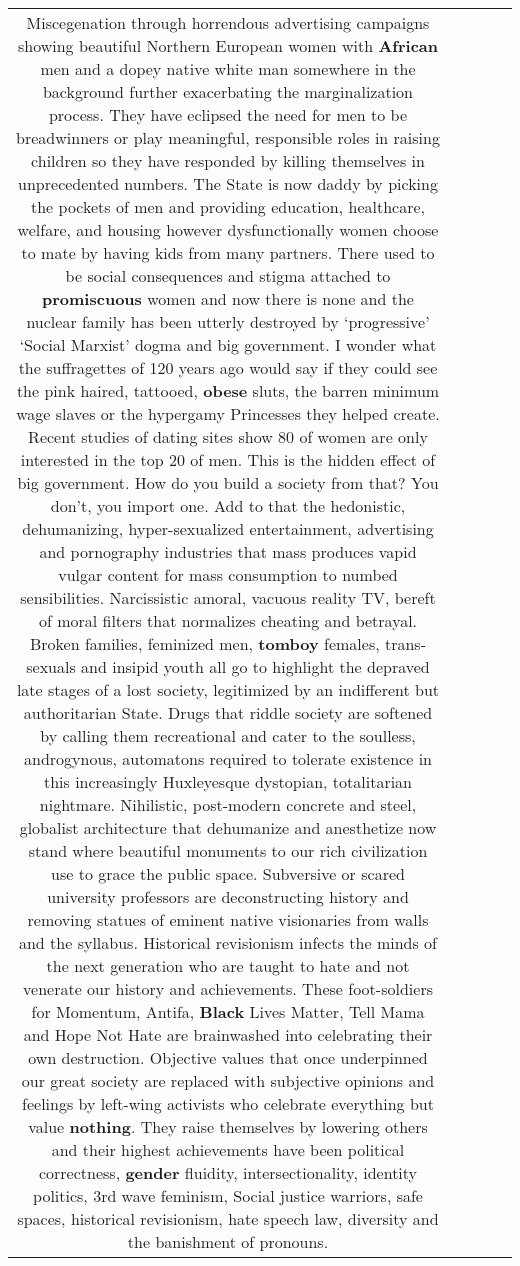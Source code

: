\documentclass[11pt]{article}
\newlength\mylength
\begin{document}
\begin{center}
\begin{longtable}{|C{.65\mylength}|C{.30\mylength}|C{.12\mylength}|C{.12\mylength}|C{.12\mylength}|}
Miscegenation through horrendous advertising campaigns showing beautiful Northern European women with \textbf{African} men and a dopey native white man somewhere in the background further exacerbating the marginalization process. They have eclipsed the need for men to be breadwinners or play meaningful, responsible roles in raising children so they have responded by killing themselves in unprecedented numbers.
 The State is now daddy by picking the pockets of men and providing education, healthcare, welfare, and housing however dysfunctionally women choose to mate by having kids from many partners. There used to be social consequences and stigma attached to \textbf{promiscuous} women and now there is none and the nuclear family has been utterly destroyed by ‘progressive' ‘Social Marxist' dogma and big government. I wonder what the suffragettes of 120 years ago would say if they could see the pink haired, tattooed, \textbf{obese} sluts, the barren minimum wage slaves or the hypergamy Princesses they helped create. Recent studies of dating sites show 80 of women are only interested in the top 20 of men. This is the hidden effect of big government. How do you build a society from that? You don't, you import one. 
Add to that the hedonistic, dehumanizing, hyper-sexualized entertainment, advertising and pornography industries that mass produces vapid vulgar content for mass consumption to numbed sensibilities. Narcissistic amoral, vacuous reality TV, bereft of moral filters that normalizes cheating and betrayal. Broken families, feminized men, \textbf{tomboy} females, trans-sexuals and insipid youth all go to highlight the depraved late stages of a lost society, legitimized by an indifferent but authoritarian State. 
Drugs that riddle society are softened by calling them recreational and cater to the soulless, androgynous, automatons required to tolerate existence in this increasingly Huxleyesque dystopian, totalitarian nightmare.
Nihilistic, post-modern concrete and steel, globalist architecture that dehumanize and anesthetize now stand where beautiful monuments to our rich civilization use to grace the public space. Subversive or scared university professors are deconstructing history and removing statues of eminent native visionaries from walls and the syllabus. Historical revisionism infects the minds of the next generation who are taught to hate and not venerate our history and achievements. These foot-soldiers for Momentum, Antifa, \textbf{Black} Lives Matter, Tell Mama and Hope Not Hate are brainwashed into celebrating their own destruction.
Objective values that once underpinned our great society are replaced with subjective opinions and feelings by left-wing activists who celebrate everything but value \textbf{nothing}. They raise themselves by lowering others and their highest achievements have been political correctness, \textbf{gender} fluidity, intersectionality, identity politics, 3rd wave feminism, Social justice warriors, safe spaces, historical revisionism, hate speech law, diversity and the banishment of pronouns. 

\end{longtable}
\end{center}
\end{document}
